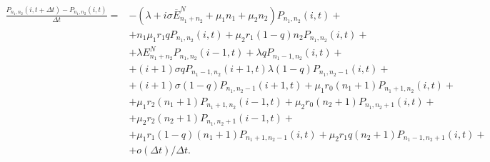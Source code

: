 \begin{equation*}
	\begin{split}
\frac{P_{n_{1}, n_{2}}(i,t+\Delta t) - P_{n_{1}, n_{2}}(i, t)}{\Delta t}=&-(\lambda+i\sigma \overline{E}_{n_{1}+n_{2}}^N+\mu_{1}n_{1}+\mu_{2}n_{2})P_{n_{1}, n_{2}}(i,t)+\\
&+ n_{1}\mu_{1}r_{1}qP_{n_{1}, n_{2}}(i,t)+ \mu_{2}r_{1}(1-q)n_{2}P_{n_{1}, n_{2}}(i,t)+\\
&+ \lambda E_{n_{1}+n_{2}}^N P_{n_{1}, n_{2}}(i-1,t)+\lambda qP_{n_{1}-1, n_{2}}(i,t)+\\
&+ (i+1) \sigma q P_{n_{1}-1, n_{2}}(i+1,t)\lambda (1-q)P_{n_{1}, n_{2}-1}(i,t) +\\
&+ (i+1) \sigma (1-q) P_{n_{1}, n_{2}-1}(i+1,t)+ \mu_{1} r_{0}(n_{1}+1) P_{n_{1} +1 , n_{2}}(i,t) +\\
&+ \mu_{1} r_{2} (n_{1}+1) P_{n_{1} + 1, n_{2}}(i-1,t)+ \mu_{2} r_{0}(n_{2}+1) P_{n_{1}, n_{2} + 1 }(i,t)+\\
&+\mu_{2} r_{2} (n_{2}+1) P_{n_{1}, n_{2} + 1}(i-1,t)+\\
&+\mu_{1} r_{1}(1-q)(n_{1}+1) P_{n_{1} +1 , n_{2}-1}(i,t)+\mu_{2} r_{1}q (n_{2}+1)P_{n_{1} -1 , n_{2}+1}(i,t)+\\
&+ o(\Delta t)/\Delta t.
\end{split}
\end{equation*}

